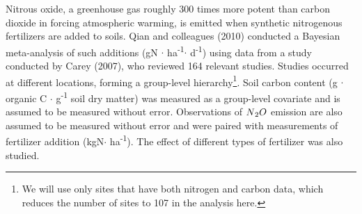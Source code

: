 \documentclass[12pt, oneside]{article}
\begin{document}
Nitrous oxide, a greenhouse gas roughly 300 times more potent than carbon dioxide in forcing atmospheric warming, is emitted when synthetic nitrogenous fertilizers are added to soils. Qian and colleagues (2010) conducted a Bayesian meta-analysis of such additions (gN $\cdot$ ha\textsuperscript{-1}$\cdot$ d\textsuperscript{-1}) using data from a study conducted by Carey (2007), who reviewed 164 relevant studies. Studies occurred at different locations, forming a group-level hierarchy\footnote{We will use only sites that have both nitrogen and carbon data, which reduces the number of sites to 107 in the analysis here.}. Soil carbon content (g $\cdot$ organic C $\cdot$ g\textsuperscript{-1} soil dry matter) was measured as a group-level covariate and is assumed to be measured without error. Observations of $N\textsubscript{2}O$ emission are also assumed to be measured without error and were paired with measurements of fertilizer addition (kgN$\cdot$ ha\textsuperscript{-1}). The effect of different types of fertilizer was also studied. 
\end{document}
